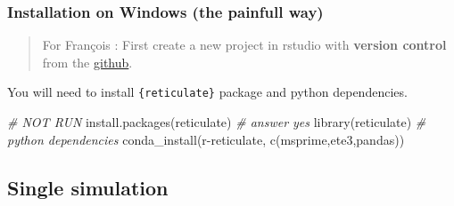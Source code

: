 \documentclass[
]{article}
\newenvironment{Shaded}{\begin{snugshade}}{\end{snugshade}}
\newcommand{\AttributeTok}[1]{\textcolor[rgb]{0.77,0.63,0.00}{#1}}
\newcommand{\CommentTok}[1]{\textcolor[rgb]{0.56,0.35,0.01}{\textit{#1}}}
\newcommand{\DecValTok}[1]{\textcolor[rgb]{0.00,0.00,0.81}{#1}}
\newcommand{\FloatTok}[1]{\textcolor[rgb]{0.00,0.00,0.81}{#1}}
\newcommand{\FunctionTok}[1]{\textcolor[rgb]{0.00,0.00,0.00}{#1}}
\newcommand{\NormalTok}[1]{#1}
\newcommand{\OtherTok}[1]{\textcolor[rgb]{0.56,0.35,0.01}{#1}}
\newcommand{\SpecialCharTok}[1]{\textcolor[rgb]{0.00,0.00,0.00}{#1}}
\newcommand{\StringTok}[1]{\textcolor[rgb]{0.31,0.60,0.02}{#1}}
\begin{document}
\hypertarget{installation-on-windows-the-painfull-way}{%
\subsubsection{Installation on Windows (the painfull
way)}\label{installation-on-windows-the-painfull-way}}

\begin{quote}
For François : First create a new project in rstudio with
\textbf{version control} from the
\href{https://github.com/thegreatlizzyator/ecophylo}{github}.
\end{quote}

You will need to install \texttt{\{reticulate\}} package and python
dependencies.

\begin{Shaded}
\begin{Highlighting}[]
\CommentTok{\# NOT RUN}
\FunctionTok{install.packages}\NormalTok{(}\StringTok{\textquotesingle{}reticulate\textquotesingle{}}\NormalTok{) }\CommentTok{\# answer yes}
\FunctionTok{library}\NormalTok{(reticulate)}
\CommentTok{\# python dependencies}
\FunctionTok{conda\_install}\NormalTok{(}\StringTok{\textquotesingle{}r{-}reticulate\textquotesingle{}}\NormalTok{, }\FunctionTok{c}\NormalTok{(}\StringTok{\textquotesingle{}msprime\textquotesingle{}}\NormalTok{,}\StringTok{\textquotesingle{}ete3\textquotesingle{}}\NormalTok{,}\StringTok{\textquotesingle{}pandas\textquotesingle{}}\NormalTok{))}
\end{Highlighting}
\end{Shaded}

\hypertarget{single-simulation}{%
\subsection{Single simulation}\label{single-simulation}}

\begin{Shaded}
\end{Shaded}
\end{document}
